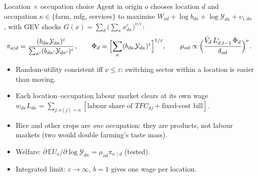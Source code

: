 \documentclass[10pt,aspectratio=169]{beamer}
\begin{document}
\begin{frame}{Location $\times$ occupation choice}
  Agent in origin $o$ chooses location $d$ and occupation $\kappa\in\{$farm, mfg,
  services$\}$ to maximise
  $W_{od}+\log b_{d\kappa}+\log\mathcal Y_{d\kappa}+\upsilon_{i,d\kappa}$, with GEV shocks
  $G(x)=\sum_d\bigl(\sum_\kappa x_{d\kappa}^{\varepsilon}\bigr)^{\nu/\varepsilon}$:
  \begin{equation*}
    \pi_{\kappa\mid d}=\frac{(b_{d\kappa}\mathcal Y_{d\kappa})^{\varepsilon}}
                            {\sum_{\kappa'}(b_{d\kappa'}\mathcal Y_{d\kappa'})^{\varepsilon}},
    \qquad
    \Phi_d=\Bigl[\sum_\kappa(b_{d\kappa}\mathcal Y_{d\kappa})^{\varepsilon}\Bigr]^{1/\varepsilon},
    \qquad
    \mu_{od}\propto\Bigl(\frac{\bar V_d\,L_{d,t-1}^{\iota}\,\Phi_d}{\delta_{od}}\Bigr)^{\nu}.
  \end{equation*}
  \small
  \begin{itemize}
    \item Random-utility consistent iff $\nu\le\varepsilon$: switching sector within a
          location is easier than moving.
    \item Each location--occupation labour market clears at its own wage
          $w_{d\kappa}L_{d\kappa}=\sum_{j:o(j)=\kappa}[\text{labour share of }TFC_{dj}+\text{fixed-cost bill}]$.
    \item Rice and other crops are \emph{one} occupation: they are products, not labour
          markets (two would double farming's taste mass).
    \item Welfare: $\partial\,\mathbb E U_o/\partial\log\mathcal Y_{d\kappa}=\mu_{od}\pi_{\kappa\mid d}$ (tested).
    \item Integrated limit: $\varepsilon\to\infty$, $b=1$ gives one wage per location.
  \end{itemize}
\end{frame}
\end{document}
